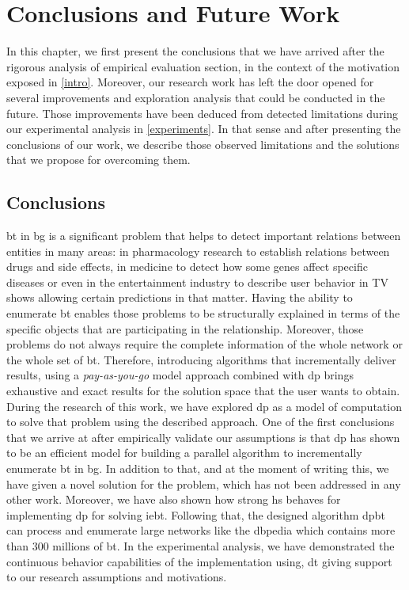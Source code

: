 \chapter{Conclusions and Future Work}\label{conclusions}
In this chapter, we first present the conclusions that we have arrived after the rigorous analysis of empirical evaluation section, 
in the context of the motivation exposed in \autoref{intro}.
Moreover, our research work has left the door opened for several improvements and exploration analysis that could be conducted in the future.
Those improvements have been deduced from detected limitations during our experimental analysis in \autoref{experiments}. In that sense and after 
presenting the conclusions of our work, we describe those observed limitations and the solutions that we propose for overcoming them.


\section{Conclusions}
\acrlong{bt} in \acrlong{bg} is a significant problem that helps to detect important relations between entities in many areas: in pharmacology research to establish relations between drugs and side effects, in medicine to detect how some genes affect specific diseases
or even in the entertainment industry to describe user behavior in TV shows allowing certain predictions in that matter.
Having the ability to enumerate \acrlong{bt} enables those problems to be structurally explained in terms of the specific objects that are participating in the relationship.  
Moreover, those problems do not always require the complete information of the whole network or the whole set of \acrlong{bt}. 
Therefore, introducing algorithms that incrementally deliver results, using a \emph{pay-as-you-go} model approach combined with \acrshort{dp} brings exhaustive and exact results for the solution space that the user wants to obtain. 
During the research of this work, we have explored \acrfull{dp} as a model of computation to solve that problem using the described approach. 
One of the first conclusions that we arrive at after empirically validate our assumptions is that \acrlong{dp} has shown to be an efficient model for building a parallel algorithm to incrementally enumerate \acrlong{bt} in \acrlong{bg}. 
In addition to that, and at the moment of writing this, we have given a novel solution for the problem, which has not been addressed in any other work.
Moreover, we have also shown how strong \acrfull{hs} behaves for implementing \acrfull{dp} for solving \acrlong{iebt}. 
Following that, the designed algorithm \acrshort{dpbt} can process and enumerate large networks like the \acrlong{dbpedia} which contains more than $300$ millions of \acrlong{bt}.
In the experimental analysis, we have demonstrated the continuous behavior capabilities of the implementation using, \acrlong{dt} giving support to our research assumptions and motivations. 

